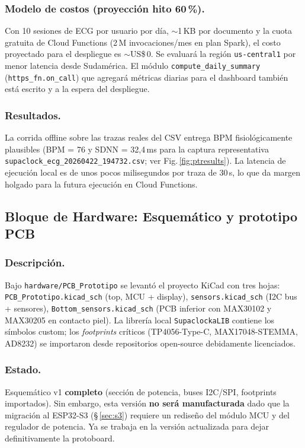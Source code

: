 \documentclass[letterpaper,11pt]{article}
\newcommand{\rfigura}[1]{Fig.\,\ref{#1}}
\begin{document}
\subsubsection{Modelo de costos (proyección hito 60\,\%).} Con 10 sesiones de ECG por usuario
por día, $\sim$1\,KB por documento y la cuota gratuita de Cloud Functions
(2\,M invocaciones/mes en plan Spark), el costo proyectado para el despliegue es
$\sim$US\$\,0. Se evaluará la región \texttt{us-central1} por menor latencia desde
Sudamérica. El módulo \texttt{compute\_daily\_summary} (\texttt{https\_fn.on\_call}) que
agregará métricas diarias para el dashboard también está escrito y a la espera del
despliegue.

\subsubsection{Resultados.} La corrida offline sobre las trazas reales del CSV entrega BPM
fisiológicamente plausibles (BPM = 76 y SDNN = 32,4\,ms para la captura representativa
\texttt{supaclock\_ecg\_20260422\_194732.csv}; ver \rfigura{fig:ptresults}). La latencia
de ejecución local es de unos pocos milisegundos por traza de 30\,s, lo que da margen
holgado para la futura ejecución en Cloud Functions.

\subsection{Bloque de Hardware: Esquemático y prototipo PCB}
\subsubsection{Descripción.} Bajo \texttt{hardware/PCB\_Prototipo} se levantó el proyecto KiCad
con tres hojas: \texttt{PCB\_Prototipo.kicad\_sch} (top, MCU + display), \texttt{sensors.kicad\_sch}
(I2C bus + sensores), \texttt{Bottom\_sensors.kicad\_sch} (PCB inferior con MAX30102 y
MAX30205 en contacto piel). La librería local \texttt{SupaclockaLIB} contiene los símbolos
custom; los \textit{footprints} críticos (TP4056-Type-C, MAX17048-STEMMA, AD8232) se
importaron desde repositorios open-source debidamente licenciados.

\subsubsection{Estado.} Esquemático v1 \textbf{completo} (sección de potencia, buses I2C/SPI,
footprints importados). Sin embargo, esta versión \textbf{no será manufacturada} dado que la
migración al ESP32-S3 (§\,\ref{sec:s3}) requiere un rediseño del módulo MCU y del regulador
de potencia. Ya se trabaja en la versión actualizada para dejar definitivamente la protoboard.
\end{document}
